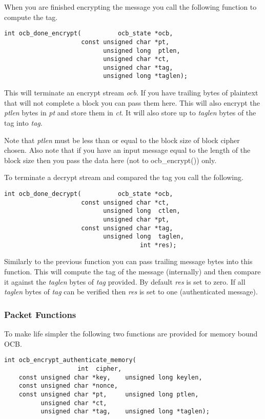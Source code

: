 \documentclass[synpaper]{book}
\begin{document}
When you are finished encrypting the message you call the following function to compute the tag.

\begin{verbatim}
int ocb_done_encrypt(          ocb_state *ocb,
                     const unsigned char *pt,
                           unsigned long  ptlen,
                           unsigned char *ct,
                           unsigned char *tag,
                           unsigned long *taglen);
\end{verbatim}

This will terminate an encrypt stream \textit{ocb}.  If you have trailing bytes of plaintext that will not complete a block
you can pass them here.  This will also encrypt the \textit{ptlen} bytes in \textit{pt} and store them in \textit{ct}.  It will also
store up to \textit{taglen} bytes of the tag into \textit{tag}.

Note that \textit{ptlen} must be less than or equal to the block size of block cipher chosen.  Also note that if you have
an input message equal to the length of the block size then you pass the data here (not to ocb\_encrypt()) only.

To terminate a decrypt stream and compared the tag you call the following.

\begin{verbatim}
int ocb_done_decrypt(          ocb_state *ocb,
                     const unsigned char *ct,
                           unsigned long  ctlen,
                           unsigned char *pt,
                     const unsigned char *tag,
                           unsigned long  taglen,
                                     int *res);
\end{verbatim}
Similarly to the previous function you can pass trailing message bytes into this function.  This will compute the
tag of the message (internally) and then compare it against the \textit{taglen} bytes of \textit{tag} provided.  By default
\textit{res} is set to zero.  If all \textit{taglen} bytes of \textit{tag} can be verified then \textit{res} is set to one (authenticated
message).

\subsubsection{Packet Functions}
To make life simpler the following two functions are provided for memory bound OCB.

\begin{verbatim}
int ocb_encrypt_authenticate_memory(
                    int  cipher,
    const unsigned char *key,    unsigned long keylen,
    const unsigned char *nonce,
    const unsigned char *pt,     unsigned long ptlen,
          unsigned char *ct,
          unsigned char *tag,    unsigned long *taglen);
\end{verbatim}
\end{document}
